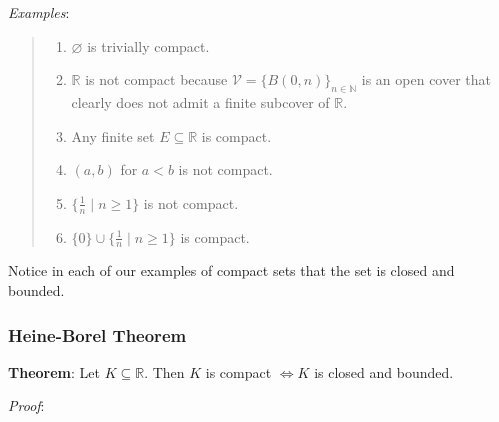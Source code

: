 \documentclass[11pt]{article}
\begin{document}
\emph{Examples}:
\begin{quote}\vspace{-0.3cm}
	\begin{enumerate}
	\item $\varnothing$ is trivially compact.
	\item $\mathbb{R}$ is not compact because $\mathcal{V} = \{B(0, n)\}_{n \in \mathbb{N}}$ is an open cover that clearly does not admit a finite subcover of $\mathbb{R}$.
	\item Any finite set $E \subseteq \mathbb{R}$ is compact.
	\item $(a,b)$ for $a < b$ is not compact.
	\item $\{\frac{1}{n} \mid n \geq 1\}$ is not compact.
	\item $\{0\} \cup \{\frac{1}{n} \mid n \geq 1\}$ is compact.
	\end{enumerate}
\end{quote}
Notice in each of our examples of compact sets that the set is closed and bounded.

\subsubsection{Heine-Borel Theorem}

\textbf{Theorem}: Let $K \subseteq \mathbb{R}$. Then $K$ is compact $\iff K$ is closed and bounded.

\emph{Proof}:
\end{document}
